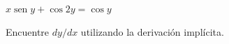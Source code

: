 \item $x \operatorname{sen} y + \cos 2y = \cos y$
\par
Encuentre $dy/dx$ utilizando la derivación implícita.
